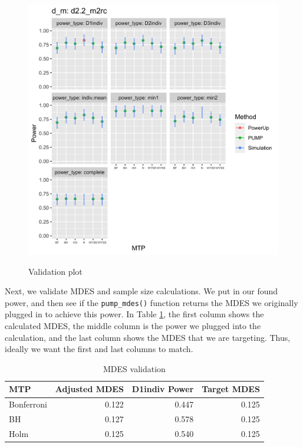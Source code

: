 \documentclass{article}
\begin{document}
\begin{figure}[h!]
\centering
  \includegraphics[width=6in]{example_validation_plot.png}
  \label{fig:validate}
  \caption{Validation plot}
\end{figure}

Next, we validate MDES and sample size calculations. We put in our found
power, and then see if the \texttt{pump\_mdes()} function returns the
MDES we originally plugged in to achieve this power. In Table
\ref{tab:mdes}, the first column shows the calculated MDES, the middle
column is the power we plugged into the calculation, and the last column
shows the MDES that we are targeting. Thus, ideally we want the first
and last columns to match.

\begin{table}[h!]
\centering
\begin{tabular}{lrrr}
\toprule
MTP & Adjusted MDES & D1indiv Power & Target MDES\\
\midrule
Bonferroni & 0.122 & 0.447 & 0.125\\
BH & 0.127 & 0.578 & 0.125\\
Holm & 0.125 & 0.540 & 0.125\\
\bottomrule
\end{tabular}
\label{tab:mdes}
\caption{MDES validation}
\end{table}
\end{document}
